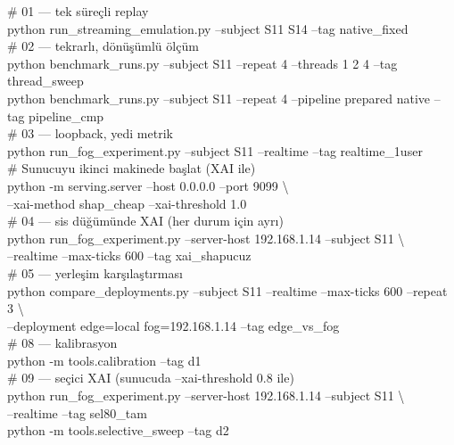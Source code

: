 \documentclass[11pt,a4paper]{report}
\begin{document}
\begin{tcolorbox}[colback=acikGri,colframe=black!30,boxrule=0.6pt,breakable]
\ttfamily\footnotesize
\# 01 --- tek süreçli replay\\
python run\_streaming\_emulation.py --subject S11 S14 --tag native\_fixed\\[0.5em]

\# 02 --- tekrarlı, dönüşümlü ölçüm\\
python benchmark\_runs.py --subject S11 --repeat 4 --threads 1 2 4 --tag thread\_sweep\\
python benchmark\_runs.py --subject S11 --repeat 4 --pipeline prepared native --tag pipeline\_cmp\\[0.5em]

\# 03 --- loopback, yedi metrik\\
python run\_fog\_experiment.py --subject S11 --realtime --tag realtime\_1user\\[0.5em]

\# Sunucuyu ikinci makinede başlat (XAI ile)\\
python -m serving.server --host 0.0.0.0 --port 9099 \textbackslash\\
\hspace*{2em}--xai-method shap\_cheap --xai-threshold 1.0\\[0.5em]

\# 04 --- sis düğümünde XAI (her durum için ayrı)\\
python run\_fog\_experiment.py --server-host 192.168.1.14 --subject S11 \textbackslash\\
\hspace*{2em}--realtime --max-ticks 600 --tag xai\_shapucuz\\[0.5em]

\# 05 --- yerleşim karşılaştırması\\
python compare\_deployments.py --subject S11 --realtime --max-ticks 600 --repeat 3 \textbackslash\\
\hspace*{2em}--deployment edge=local fog=192.168.1.14 --tag edge\_vs\_fog\\[0.5em]

\# 08 --- kalibrasyon\\
python -m tools.calibration --tag d1\\[0.5em]

\# 09 --- seçici XAI (sunucuda --xai-threshold 0.8 ile)\\
python run\_fog\_experiment.py --server-host 192.168.1.14 --subject S11 \textbackslash\\
\hspace*{2em}--realtime --tag sel80\_tam\\
python -m tools.selective\_sweep --tag d2\\[0.5em]


\end{tcolorbox}
\end{document}
